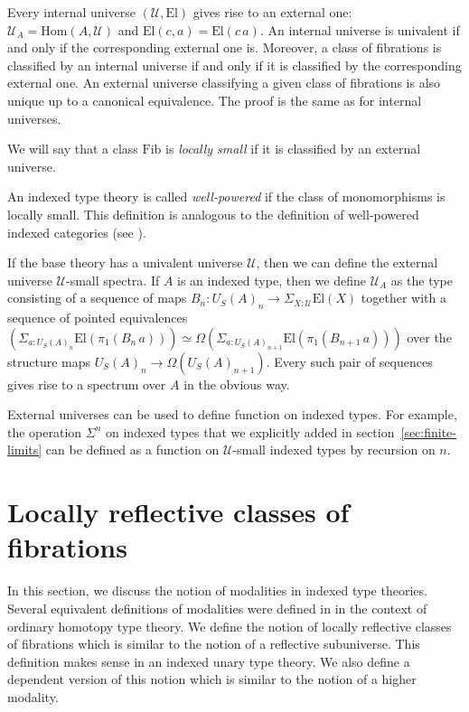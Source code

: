 \documentclass[reqno]{mscs}
\newcommand{\fs}[1]{\mathrm{#1}}
\newcommand{\Hom}{\fs{Hom}}
\newcommand{\Fib}{\fs{Fib}}
\newcommand{\El}{\fs{El}}
\numberwithin{figure}{section}
\begin{document}
Every internal universe $(\mathcal{U},\El)$ gives rise to an external one: $\mathcal{U}_A = \Hom(A,\mathcal{U})$ and $\El(c,a) = \El(c\,a)$.
An internal universe is univalent if and only if the corresponding external one is.
Moreover, a class of fibrations is classified by an internal universe if and only if it is classified by the corresponding external one.
An external universe classifying a given class of fibrations is also unique up to a canonical equivalence.
The proof is the same as for internal universes.

\begin{defn}
We will say that a class $\Fib$ is \emph{locally small} if it is classified by an external universe.
\end{defn}

\begin{defn}
An indexed type theory is called \emph{well-powered} if the class of monomorphisms is locally small.
This definition is analogous to the definition of well-powered indexed categories (see \cite[Example~B1.3.14]{elephant}).
\end{defn}

\begin{example}
If the base theory has a univalent universe $\mathcal{U}$, then we can define the external universe $\mathcal{U}$-small spectra.
If $A$ is an indexed type, then we define $\mathcal{U}_A$ as the type consisting of a sequence of maps $B_n : U_S(A)_n \to \Sigma_{X : \mathcal{U}} \El(X)$
together with a sequence of pointed equivalences $(\Sigma_{a : U_S(A)_n} \El(\pi_1(B_n\,a))) \simeq \Omega(\Sigma_{a : U_S(A)_{n+1}} \El(\pi_1(B_{n+1}\,a)))$ over the structure maps $U_S(A)_n \to \Omega(U_S(A)_{n+1})$.
Every such pair of sequences gives rise to a spectrum over $A$ in the obvious way.
\end{example}

External universes can be used to define function on indexed types.
For example, the operation $\Sigma^n$ on indexed types that we explicitly added in section~\ref{sec:finite-limits} can be defined as a function on $\mathcal{U}$-small indexed types by recursion on $n$.

\section{Locally reflective classes of fibrations}
\label{sec:refl-fib}

In this section, we discuss the notion of modalities in indexed type theories.
Several equivalent definitions of modalities were defined in \cite{modality-hott} in the context of ordinary homotopy type theory.
We define the notion of locally reflective classes of fibrations which is similar to the notion of a reflective subuniverse.
This definition makes sense in an indexed unary type theory.
We also define a dependent version of this notion which is similar to the notion of a higher modality.
\end{document}

